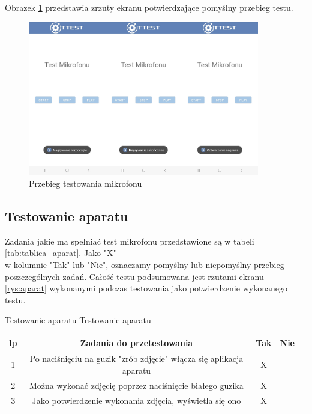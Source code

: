 Obrazek \ref{rys:mikrofon} przedstawia zrzuty ekranu potwierdzające pomyślny przebieg testu.

\begin{figure}[!hbt]
	\begin{center}
		\includegraphics[angle=360, width=0.90\textwidth]{rys/punkt5/mikrofon.jpg}
		\caption{Przebieg testowania mikrofonu}
		\label{rys:mikrofon}
	\end{center}
\end{figure} 

\newpage


\subsection{Testowanie aparatu}

Zadania jakie ma spełniać test mikrofonu przedstawione są w tabeli \ref{tab:tablica_aparat}. Jako "X" \\ w kolumnie "Tak" lub "Nie", oznaczamy pomyślny lub niepomyślny przebieg poszczególnych zadań. Całość testu podsumowana jest rzutami ekranu \ref{rys:aparat} wykonanymi podczas testowania jako potwierdzenie wykonanego testu.

\begin{tabela}
	{Testowanie aparatu}	%
	{Testowanie aparatu}	%
	{
		\begin{tabular}{|c|c|c|c|c|} \hline
			\textbf{lp} & \textbf{Zadania do przetestowania} & \textbf{Tak} & \textbf{Nie} \\ \hline
			1 & Po naciśnięciu na guzik "zrób zdjęcie" włącza się aplikacja aparatu & X & ~ \\ \hline
			2 & Można wykonać zdjęcię poprzez naciśnięcie białego guzika & X & ~ \\ \hline
			3 & Jako potwierdzenie wykonania zdjęcia, wyświetla się ono & X & ~ \\ \hline
	\end{tabular}	}
	\label{tab:tablica_aparat}
\end{tabela}

